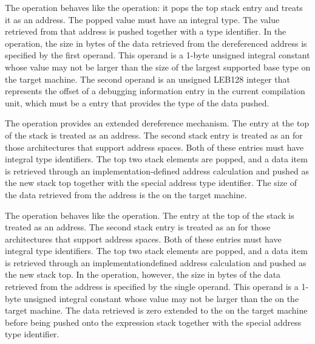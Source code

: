 \begin{enumerate}[1. ]
\itembfnl{\DWOPdereftypeTARG}
The \DWOPdereftypeNAME{} operation behaves like the \DWOPderefsize{} operation:
it pops the top stack entry and treats it as an address. 
The popped value must have an integral type.
The value retrieved from that address is pushed together with a type identifier. 
In the \DWOPdereftypeNAME{} operation, the size in
bytes of the data retrieved from the dereferenced address is specified by
the first operand. This operand is a 1-byte unsigned integral constant whose
value may not be larger than the size of the largest supported base type on
the target machine. The second operand is an unsigned LEB128 integer that
represents the offset of a debugging information entry in the current
compilation unit, which must be a \DWTAGbasetype{} entry that provides the
type of the data pushed.

\itembfnl{\DWOPxderefTARG}
The \DWOPxderefNAME{} operation provides an extended dereference
mechanism. The entry at the top of the stack is treated as an
address. The second stack entry is treated as an  for those architectures that support
address spaces. 
Both of these entries must have integral type identifiers.
The top two stack elements are popped,
and a data item is retrieved through an implementation-defined
address calculation and pushed as the new stack top together with the
special address type identifier.
The size of the data retrieved from the 
address is the
 on the target machine.

\itembfnl{\DWOPxderefsizeTARG}
The \DWOPxderefsizeNAME{} operation behaves like the
\DWOPxderef{} operation. The entry at the top of the stack is
treated as an address. The second stack entry is treated as
an  for those architectures
that support 
address spaces. 
Both of these entries must have integral type identifiers.
The top two stack
elements are popped, and a data item is retrieved through an
implementation\dash defined address calculation and pushed as the
new stack top. In the \DWOPxderefsizeNAME{} operation, however,
the size in bytes of the data retrieved from the 
address is specified by the single operand. This operand is a
1-byte unsigned integral constant whose value may not be larger
than the  on the target machine. The data
retrieved is zero extended to the  on the
target machine before being pushed onto the expression stack together
with the special address type identifier.


\end{enumerate}
